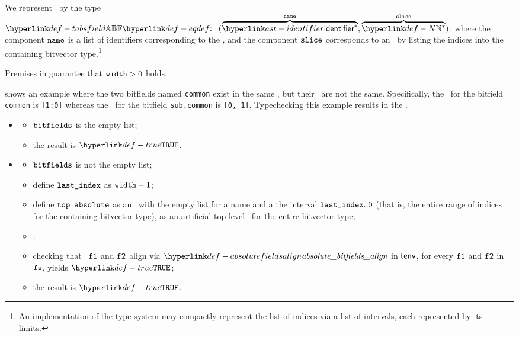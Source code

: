 \hypertarget{def-tabsfield}{}
We represent \absolutebitfields\ by the type
$\TAbsField \eqdef (\overname{\identifier^*}{\name}, \overname{\N^*}{\vslice})$,
where the component $\texttt{name}$ is a list of identifiers corresponding to the \absolutename,
and the component $\texttt{slice}$ corresponds to an \absoluteslice\ by listing the indices
into the containing bitvector type.\footnote{An implementation of the type system may compactly represent the list of indices
via a list of intervals, each represented by its limits.}

Premises in  guarantee that $\texttt{width} > 0$ holds.

 shows an example where the two bitfields named \texttt{common}
exist in the same \bitfieldscope, but their \absoluteslices\ are not the same.
Specifically, the \absoluteslice\ for the bitfield \texttt{common} is \texttt{[1:0]}
whereas the \absoluteslice\ for the bitfield \texttt{sub.common} is \texttt{[0, 1]}.
Typechecking this example results in the \typingerrorterm{} \BadSlices.


\ProseParagraph
\OneApplies
\begin{itemize}
  \item {}
  \begin{itemize}
    \item $\vbitfields$ is the empty list;
    \item the result is $\True$.
  \end{itemize}

  \item {}
  \begin{itemize}
    \item $\vbitfields$ is not the empty list;
    \item define $\texttt{last\_index}$ as $\texttt{width} - 1$;
    \item define $\vtopabsolute$ as an \absolutebitfield\ with the empty list
          for a name and a the interval $\texttt{last\_index}..0$ (that is, the entire range
          of indices for the containing bitvector type),
          as an artificial top-level \absolutebitfield\ for the entire bitvector type;
    \item \Prosebitfieldstoabsolute{$\tenv$}{$\vbitfields$}{$\vtopabsolute$}{$\vfs$};
    \item checking that \absolutebitfields\ $\texttt{f1}$ and $\texttt{f2}$ align via
          $\absolutebitfieldsalign$ in $\tenv$, for every $\texttt{f1}$ and $\texttt{f2}$ in $\vfs$,
          yields $\True$\ProseTerminateAs{\BadSlices};
    \item the result is $\True$.
  \end{itemize}
\end{itemize}


